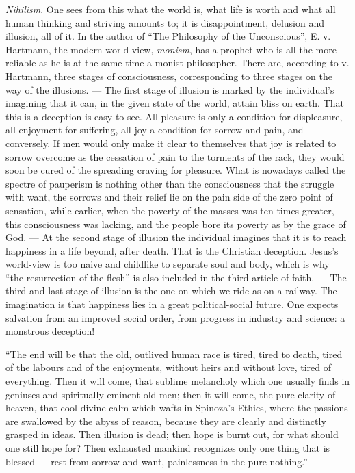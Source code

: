 \documentclass[12pt,a4paper,openany]{book}
\newcommand{\opage}[1]{\marginnote{\footnotesize\textit{[#1]}}}
\begin{document}
\emph{Nihilism}. One sees from this what the world is, what
life is worth and what all human thinking and striving
amounts to; it is disappointment, delusion and illusion, all of it.
In the author of ``The Philosophy of the Unconscious'',
E. v. Hartmann, the modern world-view,
\emph{monism}, has a prophet who is all the more reliable
as he is at the same time a monist philosopher. There
are, according to v. Hartmann, three stages of consciousness, corresponding
to three stages on the way of the illusions. --- The first stage
of illusion is marked by the individual's imagining
that it can, in the given state of the world, attain bliss
on earth. That this is a deception is easy to
see. All pleasure is only a condition for displeasure, all enjoyment
for suffering, all joy a condition for sorrow and
pain, and conversely. If men would only
make it clear to themselves that joy is related to
sorrow overcome as the cessation of pain to the torments of the rack,
they would soon be cured of the
spreading craving for pleasure. What is nowadays called
the spectre of pauperism is nothing other than the consciousness
that the struggle with want, the sorrows and their relief
lie on the pain side of the zero point of sensation,
while earlier, when the poverty of the masses was ten times greater,
this consciousness was lacking, and the people bore its poverty
as by the grace of God. --- At the second stage of illusion
the individual imagines that it is to reach happiness in a life
beyond, after death. That is the Christian deception.
Jesus's world-view is too naive and childlike to separate
soul and body, which is why ``the resurrection of the flesh''
is also included in the third article of faith. --- The
\setcounter{footnote}{0}%
\opage{93}third and last stage of illusion is the one on which we ride as
on a railway. The imagination is that happiness lies in a
great political-social future. One expects salvation
from an improved social order, from progress in industry
and science: a monstrous deception!

``The end will be that the old, outlived human race
is tired, tired to death, tired of the labours and
of the enjoyments, without heirs and without love, tired
of everything. Then it will come, that sublime melancholy
which one usually finds in geniuses and spiritually eminent
old men; then it will come, the pure clarity of heaven,
that cool divine calm which wafts in
Spinoza's Ethics, where the passions are swallowed by the abyss
of reason, because they are clearly and distinctly grasped in
ideas. Then illusion is dead; then hope is burnt out,
for what should one still hope for? Then
exhausted mankind recognizes only one thing that is blessed ---
rest from sorrow and want, painlessness in the pure nothing.''
\end{document}

